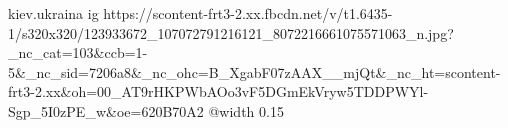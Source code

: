  
 
 
 
 

\par
kiev.ukraina
\ifcmt
  ig https://scontent-frt3-2.xx.fbcdn.net/v/t1.6435-1/s320x320/123933672_107072791216121_8072216661075571063_n.jpg?_nc_cat=103&ccb=1-5&_nc_sid=7206a8&_nc_ohc=B_XgabF07zAAX__mjQt&_nc_ht=scontent-frt3-2.xx&oh=00_AT9rHKPWbAOo3vF5DGmEkVryw5TDDPWYl-Sgp_5I0zPE_w&oe=620B70A2
  @width 0.15
\fi

